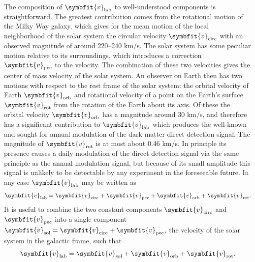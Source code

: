 \documentclass[b5paper, 10pt, twoside]{book}
\renewcommand{\vec}[1]{\symbfit{#1}}
\begin{document}
The composition of $\vec{v}_\text{lab}$ to well-understood components is straightforward. The greatest contribution comes from the rotational motion of the Milky Way galaxy, which gives for the mean motion of the local neighborhood of the solar system the circular velocity $\vec{v}_\text{circ}$ with an observed magnitude of around 220--240 km/s. The solar system has some peculiar motion relative to its surroundings, which introduces a correction $\vec{v}_\text{pec}$ to the velocity. The combination of these two velocities gives the center of mass velocity of the solar system. An observer on Earth then has two motions with respect to the rest frame of the solar system: the orbital velocity of Earth $\vec{v}_\text{orb}$ and rotational velocity of a point on the Earth's surface $\vec{v}_\text{rot}$ from the rotation of the Earth about its axis. Of these the orbital velocity $\vec{v}_\text{orb}$ has a magnitude around 30 km/s, and therefore has a significant contribution to $\vec{v}_\text{lab}$ which produces the well-known and sought for annual modulation of the dark matter direct detection signal. The magnitude of $\vec{v}_\text{rot}$ is at most about 0.46 km/s. In principle its presence causes a daily modulation of the direct detection signal via the same principle as the annual modulation signal, but because of its small amplitude this signal is unlikely to be detectable by any experiment in the foreseeable future. In any case $\vec{v}_\text{lab}$ may be written as
\begin{equation}
\vec{v}_\text{lab}=\vec{v}_\text{circ}+\vec{v}_\text{pec}+\vec{v}_\text{orb}+\vec{v}_\text{rot}.
\end{equation}
It is useful to combine the two constant components $\vec{v}_\text{circ}$ and $\vec{v}_\text{pec}$ into a single component $\vec{v}_\text{sol}=\vec{v}_\text{circ}+\vec{v}_\text{pec}$, the velocity of the solar system in the galactic frame, such that
\begin{equation}
\vec{v}_\text{lab}=\vec{v}_\text{sol}+\vec{v}_\text{orb}+\vec{v}_\text{rot}.
\end{equation}
\end{document}
